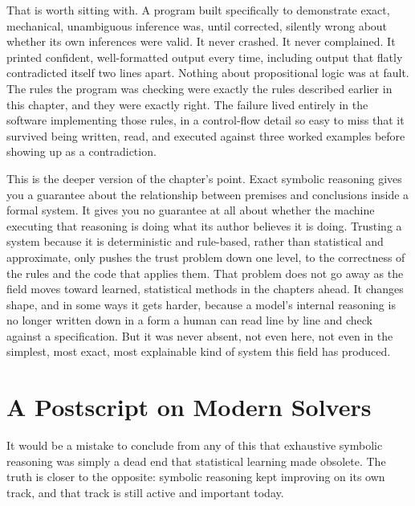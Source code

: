 That is worth sitting with. A program built specifically to demonstrate exact, mechanical, unambiguous inference was, until corrected, silently wrong about whether its own inferences were valid. It never crashed. It never complained. It printed confident, well-formatted output every time, including output that flatly contradicted itself two lines apart. Nothing about propositional logic was at fault. The rules the program was checking were exactly the rules described earlier in this chapter, and they were exactly right. The failure lived entirely in the software implementing those rules, in a control-flow detail so easy to miss that it survived being written, read, and executed against three worked examples before showing up as a contradiction.

This is the deeper version of the chapter's point. Exact symbolic reasoning gives you a guarantee about the relationship between premises and conclusions inside a formal system. It gives you no guarantee at all about whether the machine executing that reasoning is doing what its author believes it is doing. Trusting a system because it is deterministic and rule-based, rather than statistical and approximate, only pushes the trust problem down one level, to the correctness of the rules and the code that applies them. That problem does not go away as the field moves toward learned, statistical methods in the chapters ahead. It changes shape, and in some ways it gets harder, because a model's internal reasoning is no longer written down in a form a human can read line by line and check against a specification. But it was never absent, not even here, not even in the simplest, most exact, most explainable kind of system this field has produced.

\section*{A Postscript on Modern Solvers}

It would be a mistake to conclude from any of this that exhaustive symbolic reasoning was simply a dead end that statistical learning made obsolete. The truth is closer to the opposite: symbolic reasoning kept improving on its own track, and that track is still active and important today.

